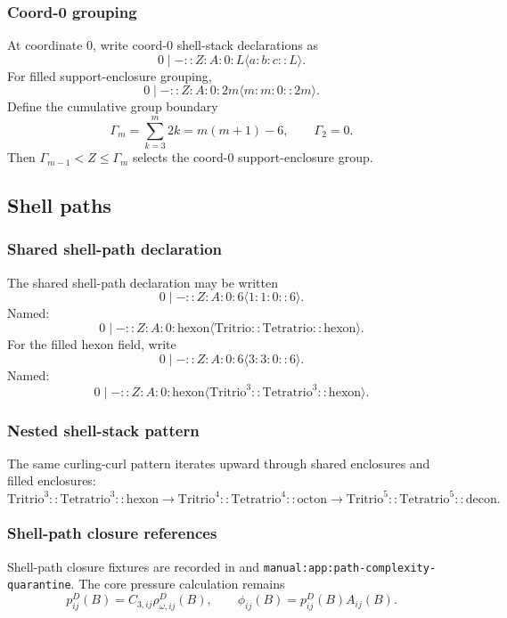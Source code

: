 \subsubsection{Coord-0 grouping}
\label{subsec:coord-zero-support-enclosure-grouping}
At coordinate \(0\), write coord-0 shell-stack declarations as
\[
0\mid-::Z:A:0:L\langle a:b:c::L\rangle.
\]
For filled support-enclosure grouping,
\[
0\mid-::Z:A:0:2m\langle m:m:0::2m\rangle.
\]
Define the cumulative group boundary
\[
\Gamma_m=\sum_{k=3}^{m}2k=m(m+1)-6,
\qquad
\Gamma_2=0.
\]
Then \(\Gamma_{m-1}<Z\le \Gamma_m\) selects the coord-0 support-enclosure group.



\subsection{Shell paths}
\label{sec:shell-paths}

\subsubsection{Shared shell-path declaration}
\label{subsec:shared-shell-path-declaration}
The shared shell-path declaration may be written
\[
0\mid-::Z:A:0:6\langle 1:1:0::6\rangle.
\]
Named:
\[
0\mid-::Z:A:0:\mathrm{hexon}\langle \mathrm{Tritrio}::\mathrm{Tetratrio}::\mathrm{hexon}\rangle.
\]
For the filled hexon field, write
\[
0\mid-::Z:A:0:6\langle 3:3:0::6\rangle.
\]
Named:
\[
0\mid-::Z:A:0:\mathrm{hexon}\langle \mathrm{Tritrio}^{3}::\mathrm{Tetratrio}^{3}::\mathrm{hexon}\rangle.
\]

\subsubsection{Nested shell-stack pattern}
\label{subsec:nested-shell-stack-pattern}
The same curling-curl pattern iterates upward through shared enclosures and filled enclosures:
\[
\mathrm{Tritrio}^{3}::\mathrm{Tetratrio}^{3}::\mathrm{hexon}
\to
\mathrm{Tritrio}^{4}::\mathrm{Tetratrio}^{4}::\mathrm{octon}
\to
\mathrm{Tritrio}^{5}::\mathrm{Tetratrio}^{5}::\mathrm{decon}.
\]

\subsubsection{Shell-path closure references}
\label{subsec:shell-path-closure-references}
Shell-path closure fixtures are recorded in  and \texttt{manual:app:path-complexity-quarantine}. The core pressure calculation remains
\[
p^D_{ij}(B)=C_{3,ij}\rho^D_{\omega,ij}(B),
\qquad
\phi_{ij}(B)=p^D_{ij}(B)A_{ij}(B).
\]


